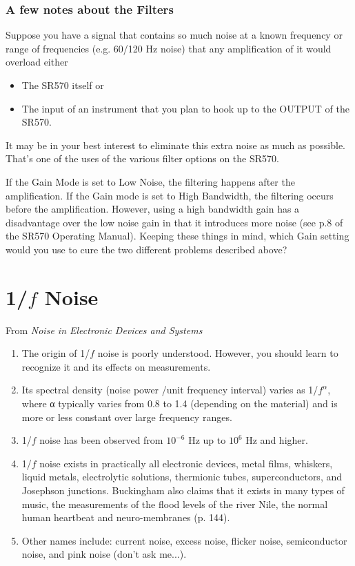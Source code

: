 \documentclass{../lab}
\begin{document}
\subsubsection{A few notes about the Filters}

Suppose you have a signal that contains so much noise at a known frequency or range of frequencies (e.g. 60/120 Hz noise) that any amplification of it would overload either

\begin{itemize}
    \item The SR570 itself or

    \item The input of an instrument that you plan to hook up to the OUTPUT of the SR570.
\end{itemize}
It may be in your best interest to eliminate this extra noise as much as possible. That's one of the uses of the various filter options on the SR570.

If the Gain Mode is set to Low Noise, the filtering happens after the amplification. If the Gain mode is set to High Bandwidth, the filtering occurs before the amplification. However, using a high bandwidth gain has a disadvantage over the low noise gain in that it introduces more noise (see p.8 of the SR570 Operating Manual). Keeping these things in mind, which Gain setting would you use to cure the two different problems described above?

\section{1/\texorpdfstring{$f$}{f} Noise}

From \emph{Noise in Electronic Devices and Systems}

\begin{enumerate}
    \item The origin of 1/$f$ noise is poorly understood. However, you should learn to recognize it and its effects on measurements.

    \item Its spectral density (noise power /unit frequency interval) varies as 1/$f^\alpha$, where α typically varies from 0.8 to 1.4 (depending on the material) and is more or less constant over large frequency ranges.

    \item 1/$f$ noise has been observed from $10^{-6}$ Hz up to $10^6$ Hz and higher.

    \item 1/$f$ noise exists in practically all electronic devices, metal films, whiskers, liquid metals, electrolytic solutions, thermionic tubes, superconductors, and Josephson junctions. Buckingham also claims that it exists in many types of music, the measurements of the flood levels of the river Nile, the normal human heartbeat and neuro-membranes (p. 144).

    \item Other names include: current noise, excess noise, flicker noise, semiconductor noise, and pink noise (don't ask me...).

\end{enumerate}
\end{document}
